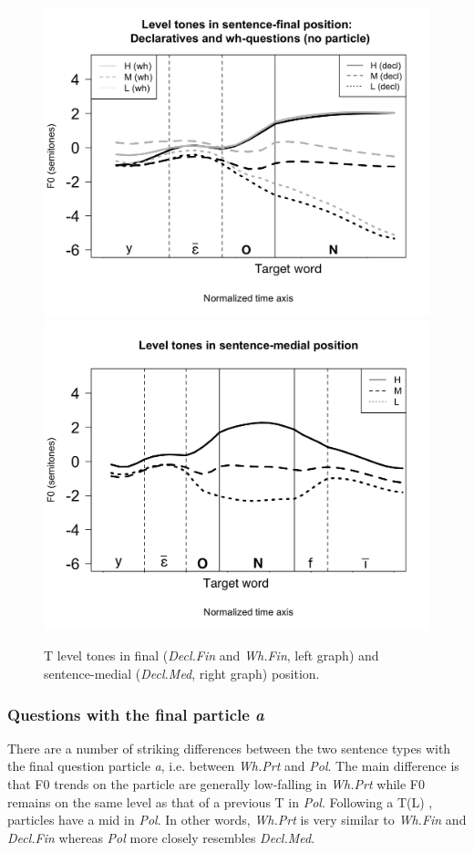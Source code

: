 \documentclass[output=paper,newtxmath,modfonts,nonflat,hidelinks]{langsci/langscibook}
\begin{document}
\begin{figure}
\begin{center}
\caption{T level tones in final (\textit{Decl.Fin} and \textit{Wh.Fin}, left graph) and sentence-medial (\textit{Decl.Med}, right graph) position.}
\label{fig:Level-decl-wh2-con}
\includegraphics[width=0.45\linewidth]{figures/Level-Decl-Wh2-AllSpeak-NewP_p.png}
\includegraphics[width=0.45\linewidth]{figures/Level-con-AllSpeak_p.png}
\end{center}
\end{figure}

\subsubsection{Questions with the final particle \textit{a}}\label{sec:gjersoe:resultsparticle}

There are a number of striking differences between the two sentence types with the final question particle \textit{a}, i.e. between \textit{Wh.Prt} and \textit{Pol}.
The main difference is that F0 trends on the particle are generally low-falling in \textit{Wh.Prt} while F0 remains on the same level as that of a previous T  in \textit{Pol}.
Following a T(L) , particles have a mid  in \textit{Pol}.
In other words, \textit{Wh.Prt} is very similar to \textit{Wh.Fin} and \textit{Decl.Fin} whereas \textit{Pol} more closely resembles \textit{Decl.Med}.
\end{document}
